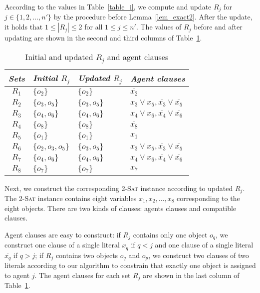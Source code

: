\begin{example}
    According to the values in Table~\ref{table_i}, we compute and update $R_j$ for $j\in \{1,2,\dots, n'\}$ by the procedure before Lemma~\ref{lem_exact2}.
    After the update, it holds that $1\leq|R_j|\leq 2$ for all $1\leq j\leq n'$. The values of $R_j$ before and after updating are shown in the second and third columns of Table~\ref{table_RR}.


    \begin{table}[h!]
        \centering
        \caption{Initial and updated $R_j$ and agent clauses}\label{table_RR}
        \begin{tabular*}{\linewidth}{@{\extracolsep{\fill}}clll}
            \hline
            \it Sets & \it Initial $R_j$ & \it Updated $R_j$& \it Agent clauses \\
            \hline
            $R_1$ & $\{o_2\}$ & $\{o_2\}$ & $\overline{x_2}$ \\
            $R_2$ & $\{o_3,o_5\}$ & $\{o_3,o_5\}$ & $x_3\vee x_5,\overline{x_3}\vee\overline{x_5}$ \\
            $R_3$ & $\{o_4,o_6\}$ & $\{o_4,o_6\}$ & $x_4\vee x_6,\overline{x_4}\vee\overline{x_6}$ \\
            $R_4$ & $\{o_8\}$ & $\{o_8\}$ & $\overline{x_8}$ \\
            $R_5$ & $\{o_1\}$ & $\{o_1\}$ & $x_1$ \\
            $R_6$ & $\{o_2,o_3,o_5\}$ & $\{o_3,o_5\}$ & $x_3\vee x_5,\overline{x_3}\vee\overline{x_5}$ \\
            $R_7$ & $\{o_4,o_6\}$ & $\{o_4,o_6\}$ & $x_4\vee x_6,\overline{x_4}\vee\overline{x_6}$ \\
            $R_8$ & $\{o_7\}$ & $\{o_7\}$ & $x_7$ \\
            \hline
        \end{tabular*}
    \end{table}

    Next, we construct the corresponding \textsc{2-Sat} instance according to updated $R_j$.
    The \textsc{2-Sat} instance contains eight variables $x_1, x_2, \dots, x_8$ corresponding to the eight objects.
    There are two kinds of clauses: agents clauses and compatible clauses.

    Agent clauses are easy to construct: if $R_j$ contains only one object $o_q$, we construct one clause of a single literal $x_q$ if $q<j$ and one clause of a single literal $\overline{x_q}$ if $q>j$; if $R_j$ contains two objects $o_q$ and $o_p$, we construct two clauses of two literals according to our algorithm to constrain that exactly one
    object is assigned to agent $j$. The agent clauses for each set $R_j$ are shown in the last column of Table~\ref{table_RR}.


\end{example}
